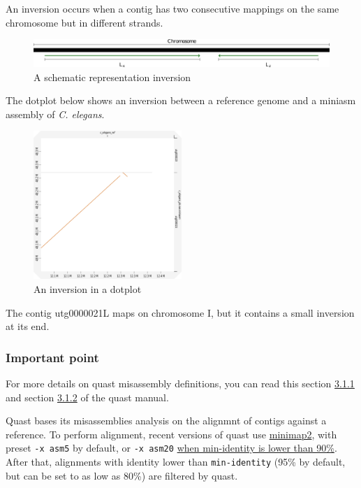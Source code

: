 \documentclass[./main.tex]{subfiles}
\begin{document}
An inversion occurs when a contig has two consecutive mappings on the
same chromosome but in different strands.

\begin{figure}[ht]
\centering
\includegraphics[width=\textwidth]{paper/misassemblies-in-noisy-assemblies/inversion_def.pdf}
\caption{A schematic representation inversion}
\end{figure}

The dotplot below shows an inversion between a reference genome and a
miniasm assembly of \emph{C. elegans}.

\begin{figure}[ht]
\centering
\includegraphics[width=0.5\textwidth]{paper/misassemblies-in-noisy-assemblies/inversion_dotplot_exemple.pdf}
\caption{An inversion in a dotplot}
\end{figure}

The contig utg0000021L maps on chromosome I, but it contains a small
inversion at its end.

\subsubsection{Important point}\label{important-point}

For more details on quast misassembly definitions, you can read this
section
\href{http://quast.bioinf.spbau.ru/manual.html\#misassemblies}{3.1.1}
and section
\href{http://quast.bioinf.spbau.ru/manual.html\#sec3.1.2}{3.1.2} of the
quast manual.

Quast bases its misassemblies analysis on the alignmnt of contigs
against a reference. To perform alignment, recent versions of quast use
\href{https://github.com/lh3/minimap2}{minimap2}, with preset
\texttt{-x\ asm5} by default, or \texttt{-x\ asm20}
\href{https://github.com/ablab/quast/blob/b040cc9140c7630eea95f94cdda3b825cf4a22c3/quast_libs/ca_utils/align_contigs.py\#L65}{when
min-identity is lower than 90\%}. After that, alignments with identity
lower than \texttt{min-identity} (95\% by default, but can be set to as
low as 80\%) are filtered by quast.
\end{document}
